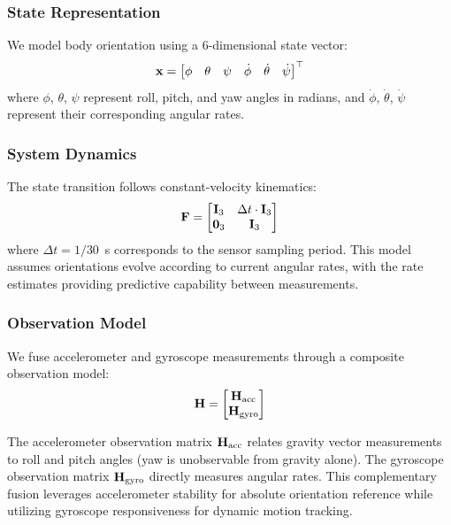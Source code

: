 \subsubsection{State Representation}
We model body orientation using a 6-dimensional state vector:
\begin{equation}
\mathbf{x} = \begin{bmatrix} \phi & \theta & \psi & \dot{\phi} & \dot{\theta} & \dot{\psi} \end{bmatrix}^\top
\label{eq:state}
\end{equation}
where $\phi$, $\theta$, $\psi$ represent roll, pitch, and yaw angles in radians, and $\dot{\phi}$, $\dot{\theta}$, $\dot{\psi}$ represent their corresponding angular rates.

\subsubsection{System Dynamics}
The state transition follows constant-velocity kinematics:
\begin{equation}
\mathbf{F} = \begin{bmatrix} \mathbf{I}_3 & \Delta t \cdot \mathbf{I}_3 \\ \mathbf{0}_3 & \mathbf{I}_3 \end{bmatrix}
\label{eq:transition}
\end{equation}
where $\Delta t = 1/30$~s corresponds to the sensor sampling period. This model assumes orientations evolve according to current angular rates, with the rate estimates providing predictive capability between measurements.

\subsubsection{Observation Model}
We fuse accelerometer and gyroscope measurements through a composite observation model:
\begin{equation}
\mathbf{H} = \begin{bmatrix} \mathbf{H}_\text{acc} \\ \mathbf{H}_\text{gyro} \end{bmatrix}
\label{eq:observation}
\end{equation}

The accelerometer observation matrix $\mathbf{H}_\text{acc}$ relates gravity vector measurements to roll and pitch angles (yaw is unobservable from gravity alone). The gyroscope observation matrix $\mathbf{H}_\text{gyro}$ directly measures angular rates. This complementary fusion leverages accelerometer stability for absolute orientation reference while utilizing gyroscope responsiveness for dynamic motion tracking.

